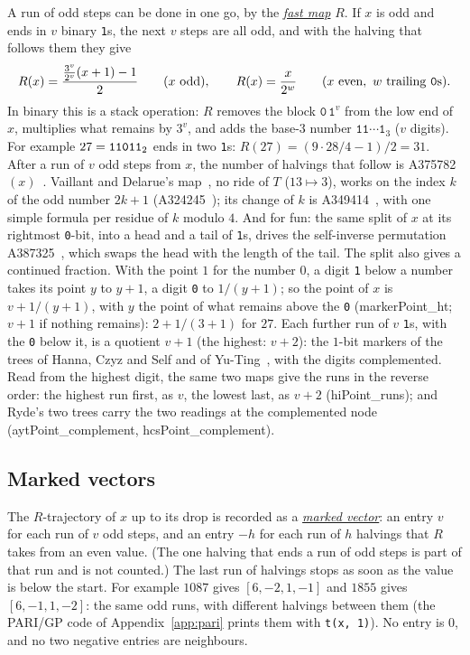 \documentclass[10pt,a4paper,titlepage]{article}
\makeatletter
\newcommand{\termhere}[1]{\leavevmode
  \Hy@raisedlink{\hyper@anchorstart{term:#1}\hyper@anchorend}}
\newcommand{\keyterm}[2]{\hyperlink{box:#1}{\emph{#2}}}
\newcommand{\lean}[1]{\textsf{#1}}
\newcommand{\bin}[1]{\text{\texttt{#1}}_2}
\makeatother
\begin{document}
\termhere{R}A run of odd steps can be done in one go, by the \keyterm{R}{fast map} $R$. If $x$ is odd and ends in $v$ binary
\texttt{1}s, the next $v$ steps are all odd, and with the halving that follows them they give
\[
R(x) = \frac{\tfrac{3^v}{2^v}(x+1) - 1}{2} \qquad (x \text{ odd}),
\qquad R(x) = \frac{x}{2^w} \qquad (x \text{ even}, \ w \text{ trailing \texttt{0}s}).
\]
In binary this is a stack operation: $R$ removes the block $\texttt{0}\,\texttt{1}^v$ from the low
end of $x$, multiplies what remains by $3^v$, and adds the base-$3$ number
$\texttt{11}\cdots\texttt{1}_3$ ($v$ digits).
For example $27 = \bin{11011}$ ends in two \texttt{1}s: $R(27) = (9\cdot 28/4 - 1)/2 = 31$.
After a run of $v$ odd steps from $x$, the number of halvings that follow is
A375782$(x)$~\cite{OEIS_A375782}. Vaillant and Delarue's map~\cite{VaillantDelarue2019}, no ride of $T$ ($13 \mapsto 3$), works on the index $k$ of the odd number $2k+1$
(A324245~\cite{OEIS_A324245}); its change of $k$ is
A349414~\cite{OEIS_A349414}, with one simple formula per residue of $k$
modulo $4$. And for fun: the same split of $x$ at its rightmost
\texttt{0}-bit, into a head and a tail of \texttt{1}s, drives the self-inverse permutation
A387325~\cite{OEIS_A387325}, which swaps the head with the length of the tail.
The split also gives a continued fraction. With the point $1$ for the number $0$, a digit
\texttt{1} below a number takes its point $y$ to $y+1$, a digit \texttt{0} to $1/(y+1)$; so the
point of $x$ is $v + 1/(y+1)$, with $y$ the point of what remains above the \texttt{0} (\lean{markerPoint\_ht}; $v + 1$ if nothing remains):
$2 + 1/(3+1)$ for $27$. Each further run of $v$ \texttt{1}s, with the \texttt{0} below it, is a
quotient $v+1$ (the highest: $v+2$): the $1$-bit markers of the trees of Hanna, Czyz and Self
and of Yu-Ting~\cite{Ryde2020}, with the digits complemented. Read from the highest digit,
the same two maps give the runs in the reverse order: the highest run first, as $v$, the
lowest last, as $v+2$ (\lean{hiPoint\_runs}); and Ryde's two trees carry the two readings at
the complemented node (\lean{aytPoint\_complement}, \lean{hcsPoint\_complement}).

\subsection*{Marked vectors}

\termhere{markedvector}The $R$-trajectory of $x$ up to its drop is recorded as a \keyterm{markedvector}{marked
vector}: an entry $v$ for each run of $v$ odd steps, and an entry $-h$ for each
run of $h$ halvings that $R$ takes from an even value. (The one halving that ends
a run of odd steps is part of that run and is not counted.) The last run of
halvings stops as soon as the value is below the start. For example $1087$ gives
$[6, -2, 1, -1]$ and $1855$ gives $[6, -1, 1, -2]$: the same odd runs, with
different halvings between them (the PARI/GP code of Appendix~\ref{app:pari} prints
them with \texttt{t(x, 1)}). No entry is $0$, and no two negative entries are
neighbours.
\end{document}
